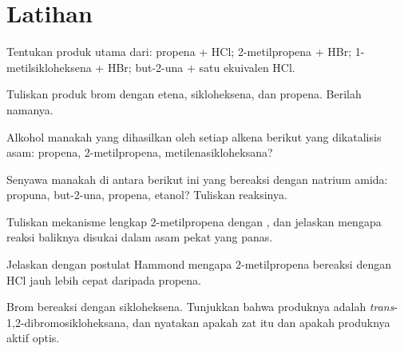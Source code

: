 \section{Latihan}

\begin{exercise}[$\star$]\label{exo:b1:electrophilic-additions:1}
Tentukan produk utama dari: propena + HCl; 2-metilpropena + HBr;
1-metilsikloheksena + HBr; but-2-una + satu ekuivalen HCl.
\end{exercise}

\begin{exercise}[$\star$]\label{exo:b1:electrophilic-additions:2}
Tuliskan produk brom dengan etena, sikloheksena, dan propena. Berilah
namanya.
\end{exercise}

\begin{exercise}[$\star$]\label{exo:b1:electrophilic-additions:3}
Alkohol manakah yang dihasilkan oleh  setiap alkena berikut yang
dikatalisis asam: propena, 2-metilpropena, metilenasikloheksana?
\end{exercise}

\begin{exercise}[$\star$]\label{exo:b1:electrophilic-additions:4}
Senyawa manakah di antara berikut ini yang bereaksi dengan natrium amida:
propuna, but-2-una, propena, etanol? Tuliskan reaksinya.
\end{exercise}

\begin{exercise}[$\star\star$]\label{exo:b1:electrophilic-additions:5}
Tuliskan mekanisme lengkap  2-metilpropena dengan ,
dan jelaskan mengapa reaksi baliknya disukai dalam asam pekat yang panas.
\end{exercise}

\begin{exercise}[$\star\star$]\label{exo:b1:electrophilic-additions:6}
Jelaskan dengan postulat Hammond mengapa 2-metilpropena bereaksi dengan
HCl jauh lebih cepat daripada propena.
\end{exercise}

\begin{exercise}[$\star\star$]\label{exo:b1:electrophilic-additions:7}
Brom bereaksi dengan sikloheksena. Tunjukkan bahwa produknya adalah
\textit{trans}-1,2-dibromosikloheksana, dan nyatakan apakah zat itu 
dan apakah produknya aktif optis.
\end{exercise}

